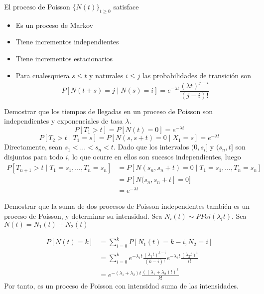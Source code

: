 \documentclass[PREyA.tex]{subfiles}
\begin{document}
\newpage
\begin{prop}
El proceso de Poisson $\{N(t)\}_{t\geq 0}$ satisface
\begin{itemize}
\item Es un proceso de Markov
\item Tiene incrementos independientes
\item Tiene incrementos estacionarios
\item Para cualesquiera $s\leq t$ y naturales $i\leq j$ las probabilidades de transición son
$$
P[N(t+s)=j\mid N(s)=i] = e^{-\lambda t}\frac{(\lambda t)^{j-i}}{(j-i)!}
$$
\end{itemize}
\end{prop}
\begin{example}
Demostrar que los tiempos de llegadas en un proceso de Poisson son independientes y exponenciales de tasa $\lambda$. 
$$
P[T_1 > t] =  P[N(t) = 0] = e^{-\lambda t}
$$
$$
P[T_2 > t\mid T_1 = s] =  P[N(s,s+t) = 0\mid X_1 = s] = e^{-\lambda t}
$$
Directamente, sean $s_1<\dotsc<s_n<t$. Dado que los intervalos $(0,s_i]$ y $(s_n,t]$ son disjuntos para todo $i$, lo que ocurre en ellos son sucesos independientes, luego
\begin{align*}
P[T_{n+1} > t \mid T_1 = s_1,\dotsc, T_n = s_n] &= P[N(s_n,s_n+t)=0 \mid T_1 = s_1,\dotsc, T_n = s_n]\\
& = P[N(s_n,s_n+t] = 0]\\
&= e^{-\lambda t}
\end{align*}
\end{example}
\begin{example}
Demostrar que la suma de dos procesos de Poisson independentes también es un proceso de Poisson, y determinar su intensidad. Sea $N_i(t)\sim PPoi(\lambda_i t)$. Sea $N(t)=N_1(t)+N_2(t)$

\begin{align*}
P[N(t)= k] &= \sum_{i=0}^k P[N_1(t)=k-i,N_2=i] \\
&= \sum_{i=0}^k e^{-\lambda_1 t}\frac{(\lambda_1 t)^{k-i}}{(k-i)!}e^{-\lambda_2 t}\frac{(\lambda_2 t)^{i}}{i!}\\
&= e^{-(\lambda_1+\lambda_2)t}\frac{((\lambda_1+\lambda_2)t)^k}{k!}
\end{align*}
Por tanto, es un proceso de Poisson con intensidad suma de las intensidades.
\end{example}
\end{document}
